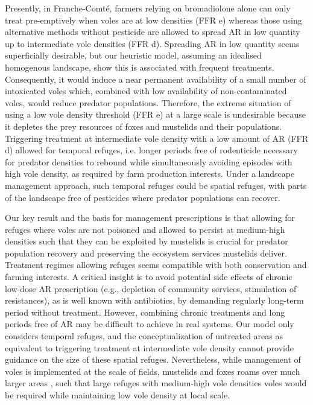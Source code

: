 \documentclass[11pt]{article}
\begin{document}
Presently, in Franche-Comté, farmers relying on bromadiolone alone can only treat pre-emptively when voles are at low densities (FFR e) whereas those using alternative methods without pesticide are allowed to spread AR in low quantity up to intermediate vole densities (FFR d). Spreading AR in low quantity seems superficially desirable, but our heuristic model, assuming an idealised homogenous landscape, show this is associated with frequent treatments. Consequently, it would induce a near permanent availability of a small number of intoxicated voles which, combined with low availability of non-contaminated voles, would reduce predator populations. Therefore, the extreme situation of using a low vole density threshold (FFR e) at a large scale is undesirable because it depletes the prey resources of foxes and mustelids and their populations. Triggering treatment at intermediate vole density with a low amount of AR (FFR d) allowed for temporal refuges, i.e. longer periods free of rodenticide necessary for predator densities to rebound while simultaneously avoiding episodes with high vole density, as required by farm production interests. Under a landscape management approach, such temporal refuges could be spatial refuges, with parts of the landscape free of pesticides where predator populations can recover.

Our key result and the basis for management prescriptions is that allowing for refuges where voles are not poisoned and allowed to persist at medium-high densities such that they can be exploited by mustelids is crucial for predator population recovery and preserving the ecosystem services mustelids deliver.  Treatment regimes allowing refuges seems compatible with both conservation and farming interests. A critical insight is to avoid potential side effects of chronic low-dose AR prescription (e.g., depletion of community services, stimulation of resistances), as is well known with antibiotics, by demanding regularly long-term period without treatment. However, combining chronic treatments and long periods free of AR may be difficult to achieve in real systems. Our model only considers temporal refuges, and the conceptualization of untreated areas as equivalent to triggering treatment at intermediate vole density cannot provide guidance on the size of these spatial refuges. Nevertheless, while management of voles is implemented at the scale of fields, mustelids and foxes roams over much larger areas  \citep{King2006}, such that large refuges with medium-high vole densities voles would be required while maintaining low vole density at local scale.
\end{document}
